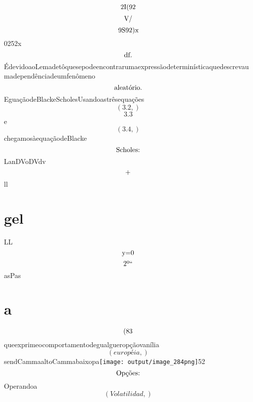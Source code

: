 \documentclass{article}
\begin{document}
\begin{equation}
$2I(92$
\end{equation}\begin{equation}
$V/$
\end{equation}\begin{equation}
$9S92)x$
\end{equation}0252x\begin{equation}
$df.$
\end{equation}ÉdevidoaoLemadetôquesepodeencontrarumaexpressãodeterminísticaquedescrevaumadependênciadeumfenômeno\begin{equation}
$aleatório.$
\end{equation}EguaçãodeBlackeScholesUsandoastrêsequações\begin{equation}
\left( 3.2,\right)
\end{equation}\begin{equation}
3.3
\end{equation}e\begin{equation}
\left( 3.4,\right)
\end{equation}chegamosàequaçãodeBlacke\begin{equation}
$Scholes:$
\end{equation}LanDVoDVdv\begin{equation}
$+$
\end{equation}ll\section{gel}LL\begin{equation}
$y=0$
\end{equation}\begin{equation}
$2º“$
\end{equation}asPas\section{a}\begin{equation}
$(83$
\end{equation}queexprimeocomportamentodegualgueropçãovanília\begin{equation}
\left( européia,\right)
\end{equation}sendCammaaltoCammabaixopa\texttt{[image: output/image\_284png]}52\begin{equation}
$Opções:$
\end{equation}Operandoa\begin{equation}
\left( Volatilidad,\right)
\end{equation}\begin{equation}

\end{equation}
\end{document}
